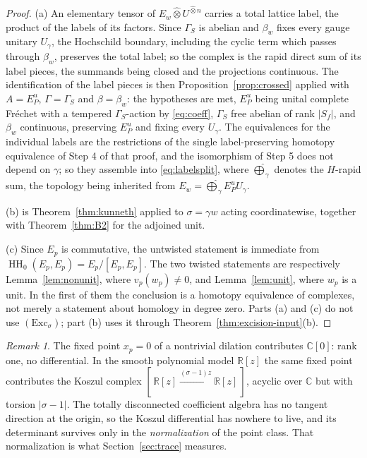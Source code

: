 \documentclass[11pt]{amsart}
\theoremstyle{definition}
\theoremstyle{remark}
\newtheorem{remark}[theorem]{Remark}
\newcommand{\C}{\mathbb C}
\newcommand{\R}{\mathbb R}
\newcommand{\HH}{\operatorname{HH}}
\begin{document}
\begin{proof}
(a)  An elementary tensor of
$E_w\widehat\otimes U^{\widehat\otimes n}$ carries
a total lattice label, the product of the labels of its factors.  Since
$\Gamma_S$ is abelian and $\beta_w$ fixes every gauge unitary $U_{\gamma}$, the
Hochschild boundary, including the cyclic term which passes through
$\beta_w$, preserves the total label; so the complex is the rapid direct sum of
its label pieces, the summands being closed and the projections continuous.
The identification of the label pieces is then
Proposition~\ref{prop:crossed} applied with $A=E_P^{u}$, $\Gamma=\Gamma_S$ and
$\beta=\beta_w$: the hypotheses are met, $E_P^{u}$ being unital complete
Fr\'echet with a tempered $\Gamma_S$-action by \eqref{eq:coeff}, $\Gamma_S$
free abelian of rank $|S_f|$, and $\beta_w$ continuous, preserving $E_P^{u}$
and fixing every $U_{\gamma}$.  The equivalences for the individual labels are
the restrictions of the single label-preserving homotopy equivalence of Step 4
of that proof, and the isomorphism of Step 5 does not depend on $\gamma$; so
they assemble into \eqref{eq:labelsplit}, where $\widehat\bigoplus_{\gamma}$
denotes the $H$-rapid sum, the topology being inherited from
$E_w=\widehat\bigoplus_{\gamma}E_P^{u}U_{\gamma}$.

(b) is Theorem~\ref{thm:kunneth} applied to $\sigma=\gamma w$ acting
coordinatewise, together with Theorem~\ref{thm:B2} for the adjoined unit.

(c)  Since $E_p$ is commutative, the untwisted statement is immediate from
$\HH_0(E_p,E_p)=E_p/[E_p,E_p]$.  The two twisted statements are respectively
Lemma~\ref{lem:nonunit}, where $v_p(w_p)\ne0$, and Lemma~\ref{lem:unit}, where
$w_p$ is a unit.  In the first of them the conclusion is a homotopy
equivalence of complexes, not merely a statement about homology in degree
zero.  Parts (a) and (c) do not use $(\mathrm{Exc}_{\sigma})$; part (b) uses it
through Theorem~\ref{thm:excision-input}(b).
\end{proof}

\begin{remark}\label{rem:notorsion}
The fixed point $x_p=0$ of a nontrivial dilation contributes $\C[0]$: rank one,
no differential.  In the smooth polynomial model $\R[z]$ the same fixed point
contributes the Koszul complex
$[\,\R[z]\xrightarrow{(\sigma-1)z}\R[z]\,]$, acyclic over $\C$ but with torsion
$|\sigma-1|$.  The totally disconnected coefficient algebra has no tangent
direction at the origin, so the Koszul differential has nowhere to live, and
its determinant survives only in the \emph{normalization} of the point class.
That normalization is what Section~\ref{sec:trace} measures.
\end{remark}
\end{document}
